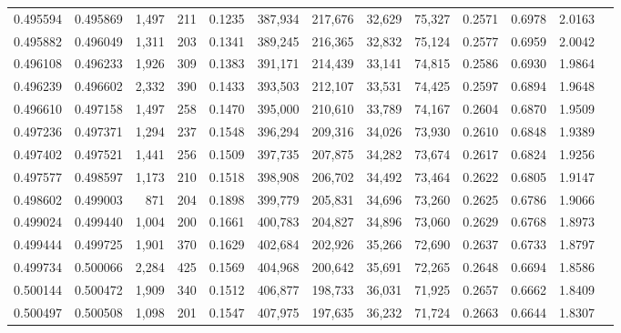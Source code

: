 \begin{tabular}{rrrrrrrrrrrrr}
0.495594 & 0.495869 &  1,497 &   211 &                                     0.1235 & 387,934 & 217,676 &  32,629 &  75,327 & 0.2571 & 0.6978 & 2.0163 \\
0.495882 & 0.496049 &  1,311 &   203 &                                     0.1341 & 389,245 & 216,365 &  32,832 &  75,124 & 0.2577 & 0.6959 & 2.0042 \\
0.496108 & 0.496233 &  1,926 &   309 &                                     0.1383 & 391,171 & 214,439 &  33,141 &  74,815 & 0.2586 & 0.6930 & 1.9864 \\
0.496239 & 0.496602 &  2,332 &   390 &                                     0.1433 & 393,503 & 212,107 &  33,531 &  74,425 & 0.2597 & 0.6894 & 1.9648 \\
0.496610 & 0.497158 &  1,497 &   258 &                                     0.1470 & 395,000 & 210,610 &  33,789 &  74,167 & 0.2604 & 0.6870 & 1.9509 \\
0.497236 & 0.497371 &  1,294 &   237 &                                     0.1548 & 396,294 & 209,316 &  34,026 &  73,930 & 0.2610 & 0.6848 & 1.9389 \\
0.497402 & 0.497521 &  1,441 &   256 &                                     0.1509 & 397,735 & 207,875 &  34,282 &  73,674 & 0.2617 & 0.6824 & 1.9256 \\
0.497577 & 0.498597 &  1,173 &   210 &                                     0.1518 & 398,908 & 206,702 &  34,492 &  73,464 & 0.2622 & 0.6805 & 1.9147 \\
0.498602 & 0.499003 &    871 &   204 &                                     0.1898 & 399,779 & 205,831 &  34,696 &  73,260 & 0.2625 & 0.6786 & 1.9066 \\
0.499024 & 0.499440 &  1,004 &   200 &                                     0.1661 & 400,783 & 204,827 &  34,896 &  73,060 & 0.2629 & 0.6768 & 1.8973 \\
0.499444 & 0.499725 &  1,901 &   370 &                                     0.1629 & 402,684 & 202,926 &  35,266 &  72,690 & 0.2637 & 0.6733 & 1.8797 \\
0.499734 & 0.500066 &  2,284 &   425 &                                     0.1569 & 404,968 & 200,642 &  35,691 &  72,265 & 0.2648 & 0.6694 & 1.8586 \\
0.500144 & 0.500472 &  1,909 &   340 &                                     0.1512 & 406,877 & 198,733 &  36,031 &  71,925 & 0.2657 & 0.6662 & 1.8409 \\
0.500497 & 0.500508 &  1,098 &   201 &                                     0.1547 & 407,975 & 197,635 &  36,232 &  71,724 & 0.2663 & 0.6644 & 1.8307 \\

\end{tabular}
